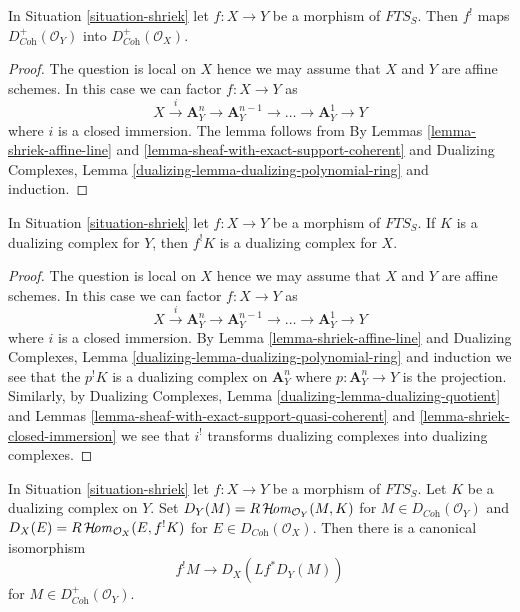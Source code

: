 \begin{lemma}
\label{lemma-shriek-coherent}
In Situation \ref{situation-shriek} let $f : X \to Y$ be a morphism of
$\textit{FTS}_S$. Then $f^!$ maps
$D_{\textit{Coh}}^+(\mathcal{O}_Y)$ into $D_{\textit{Coh}}^+(\mathcal{O}_X)$.
\end{lemma}

\begin{proof}
The question is local on $X$ hence we may assume that $X$ and $Y$ are
affine schemes. In this case we can factor $f : X \to Y$ as
$$
X \xrightarrow{i} \mathbf{A}^n_Y \to \mathbf{A}^{n - 1}_Y \to \ldots \to
\mathbf{A}^1_Y \to Y
$$
where $i$ is a closed immersion. The lemma follows from
By Lemmas \ref{lemma-shriek-affine-line} and
\ref{lemma-sheaf-with-exact-support-coherent} and
Dualizing Complexes, Lemma
\ref{dualizing-lemma-dualizing-polynomial-ring}
and induction.
\end{proof}

\begin{lemma}
\label{lemma-shriek-dualizing}
In Situation \ref{situation-shriek} let $f : X \to Y$ be a morphism of
$\textit{FTS}_S$. If $K$ is a dualizing complex
for $Y$, then $f^!K$ is a dualizing complex for $X$.
\end{lemma}

\begin{proof}
The question is local on $X$ hence we may assume that $X$ and $Y$ are
affine schemes. In this case we can factor $f : X \to Y$ as
$$
X \xrightarrow{i} \mathbf{A}^n_Y \to \mathbf{A}^{n - 1}_Y \to \ldots \to
\mathbf{A}^1_Y \to Y
$$
where $i$ is a closed immersion. By Lemma \ref{lemma-shriek-affine-line} and
Dualizing Complexes, Lemma \ref{dualizing-lemma-dualizing-polynomial-ring}
and induction we see that
the $p^!K$ is a dualizing complex on $\mathbf{A}^n_Y$ where
$p : \mathbf{A}^n_Y \to Y$ is the projection. Similarly, by
Dualizing Complexes, Lemma \ref{dualizing-lemma-dualizing-quotient}
and Lemmas
\ref{lemma-sheaf-with-exact-support-quasi-coherent} and
\ref{lemma-shriek-closed-immersion} we see that $i^!$
transforms dualizing complexes into dualizing complexes.
\end{proof}

\begin{lemma}
\label{lemma-shriek-via-duality}
In Situation \ref{situation-shriek} let $f : X \to Y$ be a morphism of
$\textit{FTS}_S$. Let $K$ be a dualizing complex
on $Y$. Set $D_Y(M) = R\mathop{\mathcal{H}\!\mathit{om}}\nolimits_{\mathcal{O}_Y}(M, K)$ for
$M \in D_{\textit{Coh}}(\mathcal{O}_Y)$ and
$D_X(E) = R\mathop{\mathcal{H}\!\mathit{om}}\nolimits_{\mathcal{O}_X}(E, f^!K)$ for
$E \in D_{\textit{Coh}}(\mathcal{O}_X)$. Then there is a canonical
isomorphism
$$
f^!M \longrightarrow D_X(Lf^*D_Y(M))
$$
for $M \in D_{\textit{Coh}}^+(\mathcal{O}_Y)$.
\end{lemma}

